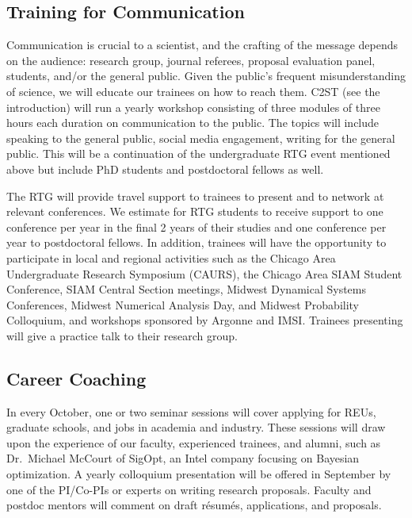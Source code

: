 \documentclass[11pt]{NSFamsart}
\newcommand{\FredNote}[1]{{\color{blue} Fred: #1}}
\begin{document}
\subsection*{Training for Communication}
Communication is crucial to a scientist, and the crafting of the message depends on the audience:  research group, journal referees, proposal evaluation panel, students, and/or the general public.  Given the public's frequent misunderstanding of science, we will educate our trainees on how to reach them.  C2ST (see the introduction) will run a yearly workshop consisting of three modules of three hours each duration on communication to the public.  The topics will include speaking to the general public, social media engagement, writing for the general public.  This will be a continuation of the undergraduate RTG event mentioned above but include PhD students and postdoctoral fellows as well.

The RTG will provide travel support to trainees to  present   and to network at relevant conferences. We estimate for RTG students to receive support to one conference per year in the final 2 years of their studies and one conference per year to postdoctoral fellows.  In addition, trainees will have the opportunity to participate in local and regional activities such as the Chicago Area Undergraduate Research Symposium (CAURS), the Chicago Area SIAM Student Conference, SIAM Central Section meetings, Midwest Dynamical Systems Conferences, Midwest Numerical Analysis Day, and Midwest Probability Colloquium, and workshops sponsored by Argonne and IMSI. Trainees presenting will give a practice talk to their research group.

\subsection*{Career Coaching}
In every October, one or two seminar sessions will cover applying for REUs, graduate schools, and jobs in academia and industry. These sessions will draw upon the experience of our faculty, experienced trainees, and alumni, such as Dr.\ Michael McCourt of SigOpt, an Intel company focusing on Bayesian optimization.  A yearly colloquium presentation  will be offered in September by one of the PI/Co-PIs or experts on writing research proposals. Faculty and postdoc mentors will comment on draft r\'esum\'es,  applications, and proposals.  


\end{document}
